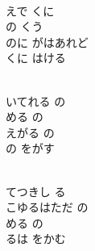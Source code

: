 \documentclass[10pt,b5j]{tarticle} %
\begin{document}
\vspace{1.5em} %
\newcommand{\linespace}{0.5em} %
\newcommand{\blocksize}{0.5\hsize} %
\newcommand{\itemmargin}{3em} %
\begin{enumerate} %
    \setlength{\itemindent}{\itemmargin} %
    \begin{minipage}[c]{\blocksize}
    
        \vspace{\linespace}
        \item~\\
        えで くに\\
        の くう\\
        のに がはあれど\\
        くに はける
        
    \end{minipage}
    \begin{minipage}[c]{\blocksize}
        
        \vspace{\linespace}
        \item~\\
        いてれる の\\
        める の\\
        えがる の\\
        の をがす
        
    \end{minipage}
    \begin{minipage}[c]{\blocksize}
        
        \vspace{\linespace}
        \item~\\
        てつきし る\\
        こゆるはただ の\\
        める の\\
        るは をかむ
        

\end{minipage}
\end{enumerate}
\end{document}

